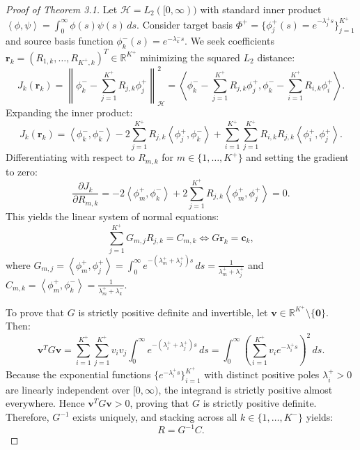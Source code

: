 \documentclass[11pt,a4paper]{article}
\theoremstyle{plain}
\theoremstyle{definition}
\newcommand{\R}{\mathbb{R}}
\newcommand{\inner}[2]{\left\langle #1, #2 \right\rangle}
\newcommand{\norm}[1]{\left\| #1 \right\|}
\begin{document}
\begin{proof}[Proof of Theorem 3.1]
Let $\mathcal{H} = L_2([0, \infty))$ with standard inner product $\inner{\phi}{\psi} = \int_0^\infty \phi(s) \psi(s) \, ds$. Consider target basis $\Phi^+ = \{\phi_j^+(s) = e^{-\lambda_j^+ s}\}_{j=1}^{K^+}$ and source basis function $\phi_k^-(s) = e^{-\lambda_k^- s}$. We seek coefficients $\bm{r}_k = (R_{1,k}, \dots, R_{K^+, k})^T \in \R^{K^+}$ minimizing the squared $L_2$ distance:
\begin{equation}
    J_k(\bm{r}_k) = \norm{ \phi_k^- - \sum_{j=1}^{K^+} R_{j, k} \phi_j^+ }_{\mathcal{H}}^2 = \inner{\phi_k^- - \sum_{j=1}^{K^+} R_{j, k} \phi_j^+}{\phi_k^- - \sum_{i=1}^{K^+} R_{i, k} \phi_i^+}.
\end{equation}
Expanding the inner product:
\begin{equation}
    J_k(\bm{r}_k) = \inner{\phi_k^-}{\phi_k^-} - 2 \sum_{j=1}^{K^+} R_{j, k} \inner{\phi_j^+}{\phi_k^-} + \sum_{i=1}^{K^+} \sum_{j=1}^{K^+} R_{i, k} R_{j, k} \inner{\phi_i^+}{\phi_j^+}.
\end{equation}
Differentiating with respect to $R_{m, k}$ for $m \in \{1, \dots, K^+\}$ and setting the gradient to zero:
\begin{equation}
    \frac{\partial J_k}{\partial R_{m, k}} = -2 \inner{\phi_m^+}{\phi_k^-} + 2 \sum_{j=1}^{K^+} R_{j, k} \inner{\phi_m^+}{\phi_j^+} = 0.
\end{equation}
This yields the linear system of normal equations:
\begin{equation}
    \sum_{j=1}^{K^+} G_{m, j} R_{j, k} = C_{m, k} \iff G \bm{r}_k = \bm{c}_k,
\end{equation}
where $G_{m, j} = \inner{\phi_m^+}{\phi_j^+} = \int_0^\infty e^{-(\lambda_m^+ + \lambda_j^+) s} \, ds = \frac{1}{\lambda_m^+ + \lambda_j^+}$ and $C_{m, k} = \inner{\phi_m^+}{\phi_k^-} = \frac{1}{\lambda_m^+ + \lambda_k^-}$.

To prove that $G$ is strictly positive definite and invertible, let $\bm{v} \in \R^{K^+} \setminus \{\mathbf{0}\}$. Then:
\begin{equation}
    \bm{v}^T G \bm{v} = \sum_{i=1}^{K^+} \sum_{j=1}^{K^+} v_i v_j \int_0^\infty e^{-(\lambda_i^+ + \lambda_j^+) s} \, ds = \int_0^\infty \left( \sum_{i=1}^{K^+} v_i e^{-\lambda_i^+ s} \right)^2 \, ds.
\end{equation}
Because the exponential functions $\{e^{-\lambda_i^+ s}\}_{i=1}^{K^+}$ with distinct positive poles $\lambda_i^+ > 0$ are linearly independent over $[0, \infty)$, the integrand is strictly positive almost everywhere. Hence $\bm{v}^T G \bm{v} > 0$, proving that $G$ is strictly positive definite. Therefore, $G^{-1}$ exists uniquely, and stacking across all $k \in \{1, \dots, K^-\}$ yields:
\begin{equation}
    R = G^{-1} C.
\end{equation}
\end{proof}
\end{document}
